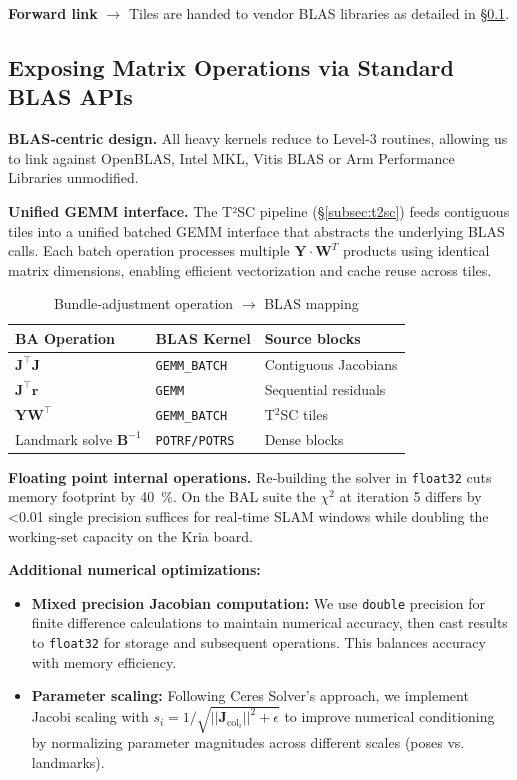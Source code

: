 \textbf{Forward link} $\rightarrow$ Tiles are handed to vendor BLAS libraries as detailed in
§\ref{subsec:blas_apis}.

\subsection{Exposing Matrix Operations via Standard BLAS APIs}
\label{subsec:blas_apis}

\textbf{BLAS‑centric design.} All heavy kernels reduce to Level‑3 routines, allowing us to link
against OpenBLAS, Intel MKL, Vitis BLAS or Arm Performance Libraries unmodified.

\textbf{Unified GEMM interface.} The T²SC pipeline (§\ref{subsec:t2sc}) feeds contiguous tiles 
into a unified batched GEMM interface that abstracts the underlying BLAS calls. Each batch operation 
processes multiple $\mathbf{Y} \cdot \mathbf{W}^T$ products using identical matrix dimensions, 
enabling efficient vectorization and cache reuse across tiles.


\begin{table}[h]
\centering
\caption{Bundle‑adjustment operation $\rightarrow$ BLAS mapping}
\label{tab:blas_mapping}
\begin{tabular}{lll}
\toprule
\textbf{BA Operation} & \textbf{BLAS Kernel} & \textbf{Source blocks} \\
\midrule
$\mathbf J^{\top}\mathbf J$                & \texttt{GEMM\_BATCH} & Contiguous Jacobians \\
$\mathbf J^{\top}\mathbf r$                & \texttt{GEMM}        & Sequential residuals \\
$\mathbf Y\mathbf W^{\top}$                & \texttt{GEMM\_BATCH} & T$^{2}$SC tiles     \\
Landmark solve $\mathbf B^{-1}$                & \texttt{POTRF/POTRS} & Dense blocks        \\
\bottomrule
\end{tabular}
\end{table}

\textbf{Floating point internal operations.} Re‑building the solver in \texttt{float32} cuts memory footprint by
\SI{40}{\percent}. On the BAL suite the $\chi^{2}$ at iteration 5 differs by <0.01 %
single precision suffices for real‑time SLAM windows while doubling the working‑set capacity on the
Kria board.

\textbf{Additional numerical optimizations:}
\begin{itemize}
\item \textbf{Mixed precision Jacobian computation:} We use \texttt{double} precision for finite difference calculations to maintain numerical accuracy, then cast results to \texttt{float32} for storage and subsequent operations. This balances accuracy with memory efficiency.
\item \textbf{Parameter scaling:} Following Ceres\cite{agarwal2012ceres} Solver's approach, we implement Jacobi scaling with $s_i = 1/\sqrt{||\mathbf{J}_{\text{col}_i}||^2 + \epsilon}$ to improve numerical conditioning by normalizing parameter magnitudes across different scales (poses vs. landmarks).
\end{itemize}

